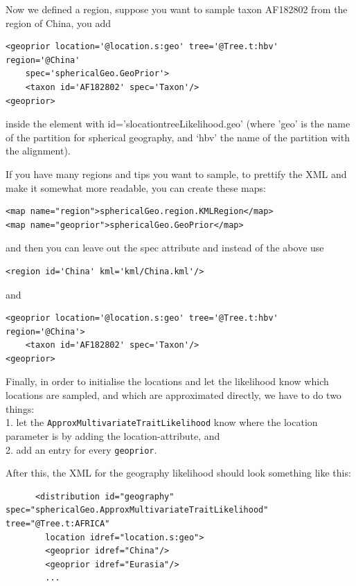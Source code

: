 \documentclass{article}
\begin{document}
Now we defined a region, suppose you want to sample taxon AF182802 from the region of China, you add

\begin{verbatim}
<geoprior location='@location.s:geo' tree='@Tree.t:hbv' region='@China'
	spec='sphericalGeo.GeoPrior'>
	<taxon id='AF182802' spec='Taxon'/> 
<geoprior>
\end{verbatim}

inside the element with id='slocationtreeLikelihood.geo' (where 'geo' is the name of the partition for spherical geography, and `hbv' the name of the partition with the alignment).


If you have many regions and tips you want to sample, to prettify the XML and make it somewhat more readable, you can create these maps:

\begin{verbatim}
<map name="region">sphericalGeo.region.KMLRegion</map>
<map name="geoprior">sphericalGeo.GeoPrior</map>
\end{verbatim}

and then you can leave out the spec attribute and instead of the above use

\begin{verbatim}
<region id='China' kml='kml/China.kml'/>
\end{verbatim}

and 

\begin{verbatim}
<geoprior location='@location.s:geo' tree='@Tree.t:hbv' region='@China'>
	<taxon id='AF182802' spec='Taxon'/>
<geoprior>
\end{verbatim}



Finally, in order to initialise the locations and let the likelihood know which locations are sampled, and which are approximated directly, we have to do two things:\\
1. let the {\tt ApproxMultivariateTraitLikelihood} know where the location parameter is by adding the location-attribute, and\\
2. add an entry for every {\tt geoprior}.

After this, the XML for the geography likelihood should look something like this:

\begin{verbatim}
      <distribution id="geography" spec="sphericalGeo.ApproxMultivariateTraitLikelihood" tree="@Tree.t:AFRICA" 
		location idref="location.s:geo">
        <geoprior idref="China"/>
        <geoprior idref="Eurasia"/>
        ...
\end{verbatim}
\end{document}
